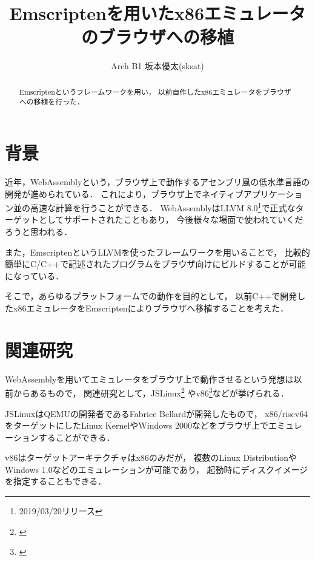 \documentclass[a4j,10pt]{jsarticle}
\begin{document}

\title{Emscriptenを用いたx86エミュレータのブラウザへの移植}

\author{
	Arch B1 坂本優太(sksat)
}


\begin{abstract}
Emscriptenというフレームワークを用い，
以前自作したx86エミュレータをブラウザへの移植を行った．
\end{abstract}

\maketitle
\thispagestyle{empty}

\section{背景}
近年，WebAssemblyという，ブラウザ上で動作するアセンブリ風の低水準言語の開発が進められている．
これにより，ブラウザ上でネイティブアプリケーション並の高速な計算を行うことができる．
WebAssemblyはLLVM 8.0\footnote{2019/03/20リリース}で正式なターゲットとしてサポートされたこともあり，
今後様々な場面で使われていくだろうと思われる．

また，EmscriptenというLLVMを使ったフレームワークを用いることで，
比較的簡単にC/C++で記述されたプログラムをブラウザ向けにビルドすることが可能になっている．

そこで，あらゆるプラットフォームでの動作を目的として，
以前C++で開発したx86エミュレータをEmscriptenによりブラウザへ移植することを考えた．

\section{関連研究}
WebAssemblyを用いてエミュレータをブラウザ上で動作させるという発想は以前からあるもので，
関連研究として，JSLinux\footnote{\cite{jslinux}}
やv86\footnote{\cite{v86}}などが挙げられる．

JSLinuxはQEMUの開発者であるFabrice Bellardが開発したもので，
x86/riscv64をターゲットにしたLinux KernelやWindows 2000などをブラウザ上でエミュレーションすることができる．

v86はターゲットアーキテクチャはx86のみだが，
複数のLinux DistributionやWindows 1.0などのエミュレーションが可能であり，
起動時にディスクイメージを指定することもできる．
\end{document}
